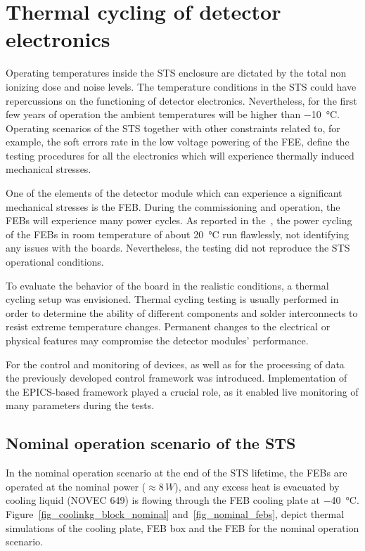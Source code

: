 \newpage
\section{Thermal cycling of detector electronics}
\label{thermal_cycling}
Operating temperatures inside the \gls{STS} enclosure are dictated by the total non ionizing dose and noise levels. The temperature conditions in the STS could have repercussions on the functioning of detector electronics. Nevertheless, for the first few years of operation the ambient temperatures will be higher than \SI{-10}{\celsius}. Operating scenarios of the \gls{STS} together with other constraints related to, for example, the soft errors rate in the low voltage powering of the \gls{FEE}, define the testing procedures for all the electronics which will experience thermally induced mechanical stresses.

One of the elements of the detector module which can experience a significant mechanical stresses is the \gls{FEB}.
During the commissioning and operation, the \glspl{FEB} will experience many power cycles. As reported in the~\cite{CBM_PR_2021}, the power cycling of the \glspl{FEB} in room temperature of about \SI{20}{\celsius} run flawlessly, not identifying any issues with the boards. Nevertheless, the testing did not reproduce the STS operational conditions.

To evaluate the behavior of the board in the realistic conditions, a thermal cycling setup was envisioned. Thermal cycling testing is usually performed in order to determine the ability of different components and solder interconnects to resist extreme temperature changes. Permanent changes to the electrical or physical features may compromise the detector modules' performance.

 For the control and monitoring of devices, as well as for the processing of data the previously developed control framework was introduced. Implementation of the EPICS-based framework played a crucial role, as it enabled live monitoring of many parameters during the tests.

\subsection{Nominal operation scenario of the STS}
\label{nominal}

In the nominal operation scenario at the end of the STS lifetime, the \glspl{FEB} are operated at the nominal power ($\approx8\,W$), and any excess heat is evacuated by cooling liquid (NOVEC 649) is flowing through the \gls{FEB} cooling plate at \SI{-40}{\celsius}. Figure~\ref{fig_coolinkg_block_nominal} and~\ref{fig_nominal_febs}, depict thermal simulations of the cooling plate, \gls{FEB} box and the \gls{FEB} for the nominal operation scenario.

